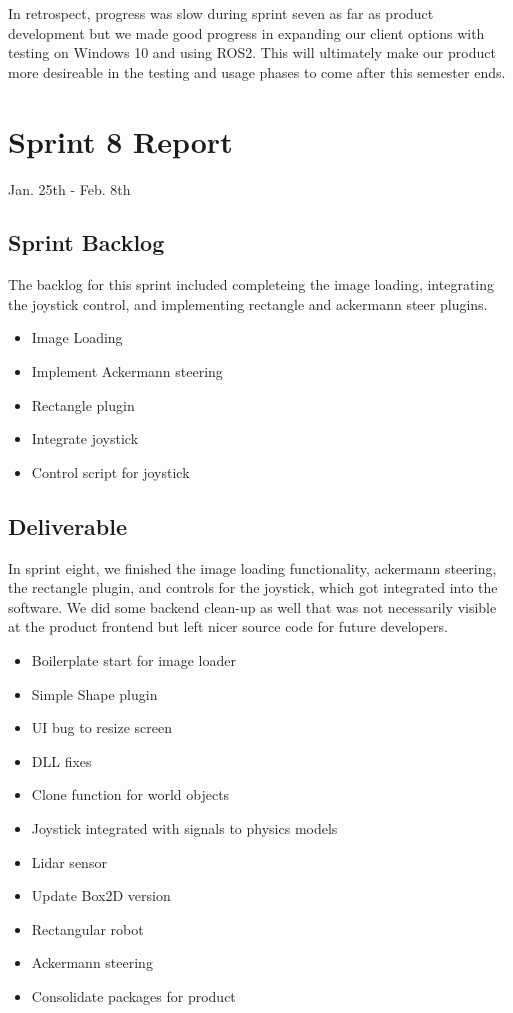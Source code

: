 In retrospect, progress was slow during sprint seven as far as product development but we made good progress in expanding our client options with testing on Windows 10 and using ROS2. This will ultimately make our product more desireable in the testing and usage phases to come after this semester ends.


\section{Sprint 8 Report}
Jan. 25th - Feb. 8th
\subsection{Sprint Backlog}

The backlog for this sprint included completeing the image loading, integrating the joystick control, and implementing rectangle and ackermann steer plugins.

\begin{itemize}
	\item Image Loading
	\item Implement Ackermann steering
	\item Rectangle plugin
	\item Integrate joystick
	\item Control script for joystick
\end{itemize}

\subsection{Deliverable}

In sprint eight, we finished the image loading functionality, ackermann steering, the rectangle plugin, and controls for the joystick, which got integrated into the software. We did some backend clean-up as well that was not necessarily visible at the product frontend but left nicer source code for future developers.

\begin{itemize}
	\item Boilerplate start for image loader
	\item Simple Shape plugin
	\item UI bug to resize screen
	\item DLL fixes
	\item Clone function for world objects
	\item Joystick integrated with signals to physics models
	\item Lidar sensor
	\item Update Box2D version
	\item Rectangular robot
	\item Ackermann steering
	\item Consolidate packages for product
\end{itemize}


